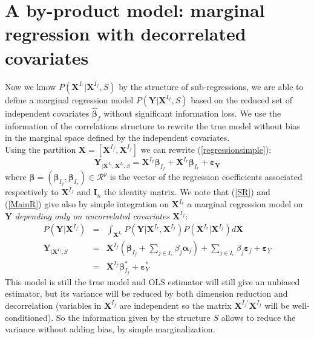 \documentclass[12pt,a4paper]{report}
\begin{document}
\section{A by-product model: marginal regression with decorrelated covariates}
Now we know $P(\boldsymbol{X}^{I_r}|\boldsymbol{X}^{I_f},S)$ by the structure of sub-regressions, we are able to define a marginal regression model $P(\boldsymbol{Y}|\boldsymbol{X}^{I_f},S)$ based on the reduced set of independent covariates $\hat{\boldsymbol{\beta}}_f$ without significant information loss. We use the information of the correlations structure to rewrite the true model without bias in the marginal space defined by the independent covariates.
 	\\
Using the partition $\boldsymbol{X}=[\boldsymbol{X}^{I_f},\boldsymbol{X}^{I_f}]$ we can rewrite (\ref{regressionsimple}):
	\begin{equation}
			\boldsymbol{Y}_{|\boldsymbol{X}^{I_f},\boldsymbol{X}^{I_r},S}=\boldsymbol{X}^{I_f}\boldsymbol{\beta}_{I_f}+\boldsymbol{X}^{I_r}\boldsymbol{\beta}_{I_r}+\boldsymbol{\varepsilon_Y} \label{MainR}
		\end{equation}
		where $\boldsymbol{\beta}=(\boldsymbol{\beta}_{I_f},\boldsymbol{\beta}_{I_r}) \in  \mathcal{R}^p$ is the vector of the regression coefficients associated respectively to $\boldsymbol{X}^{I_f}$ and $\boldsymbol{I}_n$ the identity matrix. 
We note that (\ref{SR}) and (\ref{MainR}) give also by simple integration on $\boldsymbol{X}^{I_r}$ a marginal regression model on $\boldsymbol{Y}$ {\it depending only on uncorrelated covariates $\boldsymbol{X}^{I_f}$}:
\begin{eqnarray}
		P(\boldsymbol{Y}|\boldsymbol{X}^{I_f})&=& \int_{\boldsymbol{X}^{I_r}}P(\boldsymbol{Y}|\boldsymbol{X}^{I_r},\boldsymbol{X}^{I_f})P(\boldsymbol{X}^{I_r}|\boldsymbol{X}^{I_f}) d \boldsymbol{X} \\
	\boldsymbol{Y}_{|\boldsymbol{X}^{I_f},S}&=&\boldsymbol{X}^{I_f} (\boldsymbol{\beta}_{I_f}+ \sum_{j \in I_r}\beta_{j}\boldsymbol{\alpha}_j)+  \sum_{j \in I_r}\beta_{j}\boldsymbol{\varepsilon}_j+\boldsymbol{\varepsilon}_Y \label{Trueexpl} \\
	&=&\boldsymbol{X}^{I_f}\boldsymbol{\beta}_{I_f}^*+\boldsymbol{\varepsilon}_Y^*\label{modexpl}
\end{eqnarray}
 This model is still the true model and OLS estimator will still give an unbiased estimator, but its variance will be reduced by both dimension reduction and decorrelation (variables in $\boldsymbol{X}^{I_f}$ are independent so the matrix $\boldsymbol{X}^{I_f'}\boldsymbol{X}^{I_f}$ will be well-conditioned). So the information given by the structure $S$ allows to reduce the variance without adding bias, by simple marginalization.
\end{document}
